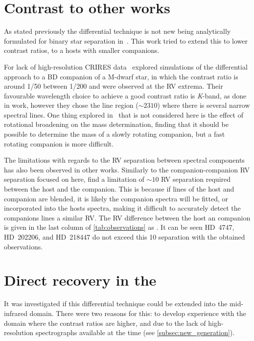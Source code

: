 \section{Contrast to other works}

As stated previously the differential technique is not new being analytically formulated for binary star separation in~\citet{ferluga_separating_1997}.
This work tried to extend this to lower contrast ratios, to a hosts with smaller companions.

For lack of high-resolution CRIRES data~\citet{kostogryz_spectral_2013} explored simulations of the differential approach to a {BD} companion of a M-dwarf star, in which the contrast ratio is around 1/50 between 1/200 and were observed at the {RV} extrema.
Their favourable wavelength choice to achieve a good contrast ratio is \emph{K}-band, as done in work, however they chose the  line region (\(\sim2310\)\nm{}) where there is several narrow spectral lines.
One thing explored in~\citet{kostogryz_spectral_2013} that is not considered here is the effect of rotational broadening on the mass determination, finding that it should be possible to determine the mass of a slowly rotating companion, but a fast rotating companion is more difficult.

The limitations with regards to the {RV} separation between spectral components has also been observed in other works.
Similarly to the companion-companion {RV} separation focused on here, \citet{kolbl_detection_2015} find a limitation of \(\sim 10\)\kmps{} {RV} separation required between the host and the companion.
This is because if lines of the host and companion are blended, it is likely the companion spectra will be fitted, or incorporated into the hosts spectra, making it difficult to accurately detect the companions lines a similar {RV}.
The {RV} difference between the host an companion is given in the last column of \cref{tab:observations} as \Rvtwo{}.
It can be seen {HD~4747}, {HD~202206}, and {HD~218447} do not exceed this 10\kmps{} separation with the obtained observations.


\section{Direct recovery in the \mir{}}
It was investigated if this differential technique could be extended into the mid-infrared {\mir{}} domain.
There were two reasons for this: to develop experience with the {\mir{}} domain where the contrast ratios are higher, and due to the lack of high-resolution \nir{} spectrographs available at the time (see \cref{subsec:new_generation}).


